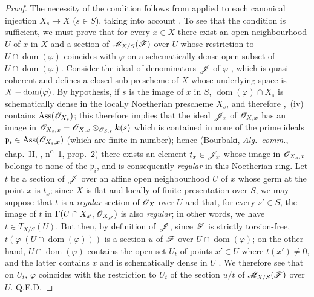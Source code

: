 \begin{proof}
The necessity of the condition follows from  applied to each canonical injection $X_s\to X$ ($s\in S$), taking into account .
To see that the condition is sufficient, we must prove that for every $x\in X$ there exist an open neighbourhood $U$ of $x$ in $X$ and a section of $\mathscr{M}_{X/S}(\mathscr{F})$ over $U$ whose restriction to $U\cap\operatorname{dom}(\varphi)$ coincides with $\varphi$ on a schematically dense open subset of $U\cap\operatorname{dom}(\varphi)$.
Consider the ideal of denominators $\mathscr{J}$ of $\varphi$ , which is quasi-coherent and defines a closed sub-prescheme of $X$ whose underlying space is $X-\operatorname{dom}(\varphi)$.
By hypothesis, if $s$ is the image of $x$ in $S$, $\operatorname{dom}(\varphi)\cap X_s$ is schematically dense in the locally Noetherian prescheme $X_s$, and therefore ,~(iv) contains $\operatorname{Ass}(\mathscr{O}_{X_s})$; this therefore implies that the ideal $\mathscr{J}_x$ of $\mathscr{O}_{X,x}$ has an image in $\mathscr{O}_{X_s,x}=\mathscr{O}_{X,x}\otimes_{\mathscr{O}_{S,s}}\boldsymbol{k}(s)$ which is contained in none of the prime ideals $\mathfrak{p}_i\in\operatorname{Ass}(\mathscr{O}_{X_s,x})$ (which are finite in number); hence (Bourbaki, \emph{Alg.~comm.}, chap.~II, , n\textsuperscript{o}~1, prop.~2) there exists an element $t_x\in\mathscr{J}_x$ whose image in $\mathscr{O}_{X_s,x}$ belongs to none of the $\mathfrak{p}_i$, and is consequently \emph{regular} in this Noetherian ring.
Let $t$ be a section of $\mathscr{J}$ over an affine open neighbourhood $U$ of $x$ whose germ at the point $x$ is $t_x$; since $X$ is flat and locally of finite presentation over $S$, we may suppose  that $t$ is a \emph{regular} section of $\mathscr{O}_X$ over $U$ and that, for every $s'\in S$, the image of $t$ in $\Gamma(U\cap X_{s'},\mathscr{O}_{X_{s'}})$ is also \emph{regular}; in other words, we have $t\in T_{X/S}(U)$.
But then, by definition of $\mathscr{J}$, since $\mathscr{F}$ is strictly torsion-free, $t(\varphi|(U\cap\operatorname{dom}(\varphi)))$ is a section $u$ of $\mathscr{F}$ over $U\cap\operatorname{dom}(\varphi)$; on the other hand, $U\cap\operatorname{dom}(\varphi)$ contains the open set $U_t$ of points $x'\in U$ where $t(x')\neq0$, and the latter contains $x$ and is schematically dense in $U$ .
We therefore see that on $U_t$, $\varphi$ coincides with the restriction to $U_t$ of the section $u/t$ of $\mathscr{M}_{X/S}(\mathscr{F})$ over $U$.
Q.E.D.
\end{proof}

